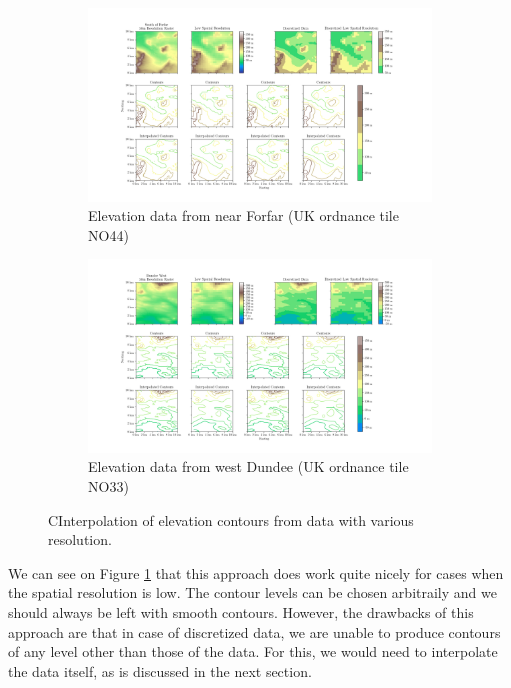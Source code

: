 \documentclass[a4paper,10pt]{report}
\begin{document}
\begin{figure}[H]
    \centering
    \begin{subfigure}{\textwidth}
        \includegraphics[width=1\textwidth]{../images/NO44/2D_Contour_Interpolation.png}
    \caption{Elevation data from near Forfar (UK ordnance tile NO44)}
    \end{subfigure}
    \begin{subfigure}{\textwidth}
        \includegraphics[width=1\textwidth]{../images/NO33/2D_Contour_Interpolation.png}
    \caption{Elevation data from west Dundee (UK ordnance tile NO33)}
    \end{subfigure}
    \caption{CInterpolation of elevation contours from data with various resolution.}
    \label{fig:2D_contour}
\end{figure}

We can see on Figure \ref{fig:2D_contour} that this approach does work quite nicely for cases when the spatial resolution is low. The contour levels can be chosen arbitraily and we should always be left with smooth contours. However, the drawbacks of this approach are that in case of discretized data, we are unable to produce contours of any level other than those of the data. For this, we would need to interpolate the data itself, as is discussed in the next section.
\end{document}
